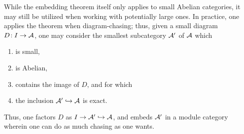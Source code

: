 \begin{remark}
	While the embedding theorem itself only applies to small Abelian categories, it may still be utilized when working with potentially large ones. In practice,
	one applies the theorem when diagram-chasing; thus, given a small diagram \(D\!:I\to\mathcal{A}\), one may consider the smallest subcategory \(\mathcal{A}'\) of \(\mathcal{A}\) which
	\begin{enumerate}[label=(\arabic*)]
	\item is small,
	\item is Abelian,
	\item contains the image of \(D\), and for which
	\item the inclusion \(\mathcal{A}'\hookrightarrow\mathcal{A}\) is exact.
	\end{enumerate}
	Thus, one factors \(D\) as \(I\to\mathcal{A}'\hookrightarrow\mathcal{A}\), and embeds \(\mathcal{A}'\) in a module category wherein one can do as much chasing as one wants.
\end{remark}

